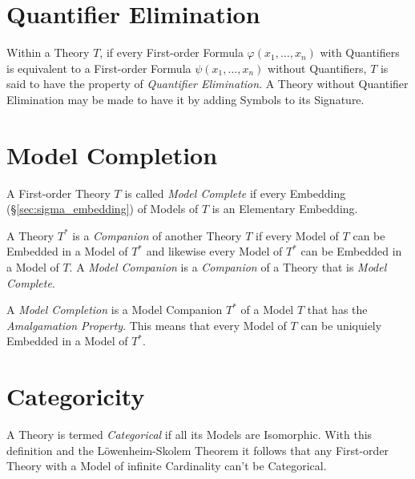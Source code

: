 \section{Quantifier Elimination}

Within a Theory $T$, if every First-order Formula $\varphi(x_1,
\ldots, x_n)$ with Quantifiers is equivalent to a First-order Formula
$\psi(x_1, \ldots, x_n)$ without Quantifiers, $T$ is said to have the
property of \emph{Quantifier Elimination}. A Theory without Quantifier
Elimination may be made to have it by adding Symbols to its Signature.



\section{Model Completion}\label{sec:model_completion}

A First-order Theory $T$ is called \emph{Model Complete} if every
Embedding (\S\ref{sec:sigma_embedding}) of Models of $T$ is an
Elementary Embedding.

A Theory $T^*$ is a \emph{Companion} of another Theory $T$ if every
Model of $T$ can be Embedded in a Model of $T^*$ and likewise every
Model of $T^*$ can be Embedded in a Model of $T$. A \emph{Model
  Companion} is a \emph{Companion} of a Theory that is \emph{Model
  Complete}.

A \emph{Model Completion} is a Model Companion $T^*$ of a Model $T$
that has the \emph{Amalgamation Property}. This means that every Model
of $T$ can be uniquiely Embedded in a Model of $T^*$.



\section{Categoricity}

A Theory is termed \emph{Categorical} if all its Models are
Isomorphic. With this definition and the L\"owenheim-Skolem Theorem it
follows that any First-order Theory with a Model of infinite
Cardinality can't be Categorical.

